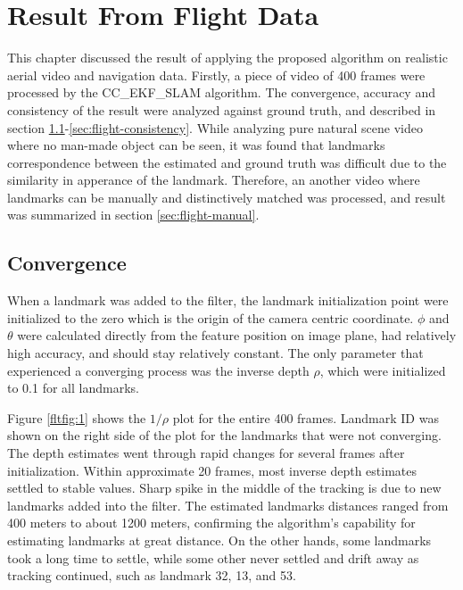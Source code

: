 \chapter{Result From Flight Data}\label{ch:FlightResult}

This chapter discussed the result of applying the proposed algorithm
on realistic aerial video and navigation data. Firstly, a piece of
video of 400 frames were processed by the CC\_EKF\_SLAM algorithm. The
convergence, accuracy and consistency of the result were analyzed
against ground truth, and described in section
\ref{sec:flight-converge}-\ref{sec:flight-consistency}. While
analyzing pure natural scene video where no man-made object can be
seen, it was found that landmarks correspondence between the
estimated and ground truth was difficult due to the
similarity in apperance of the landmark. Therefore, an another video
where landmarks can be manually and distinctively matched was
processed, and result was summarized in section \ref{sec:flight-manual}.

\section{Convergence}\label{sec:flight-converge}
When a landmark was added to the filter, the landmark initialization
point were initialized to the zero which is the origin of the camera
centric coordinate. $\phi$ and $\theta$ were calculated directly from
the feature position on image plane, had relatively high accuracy, and
should stay relatively constant. The only parameter that experienced
a converging process was the inverse depth $\rho$, which were
initialized to 0.1 for all landmarks.

Figure \ref{fltfig:1} shows the $1/\rho$ plot for the entire 400
frames. Landmark ID was shown on the right side of the plot for the
landmarks that were not converging. The depth estimates went through
rapid changes for several frames after initialization. Within
approximate 20 frames, most inverse depth estimates settled to stable
values. Sharp spike in the middle of the tracking is due to new
landmarks added into the filter. The estimated landmarks distances
ranged from 400 meters to about 1200 meters, confirming the
algorithm's capability for estimating landmarks at great distance. On
the other hands, some landmarks took a long time to settle, while some
other never settled and drift away as tracking continued, such as
landmark 32, 13, and 53. 

